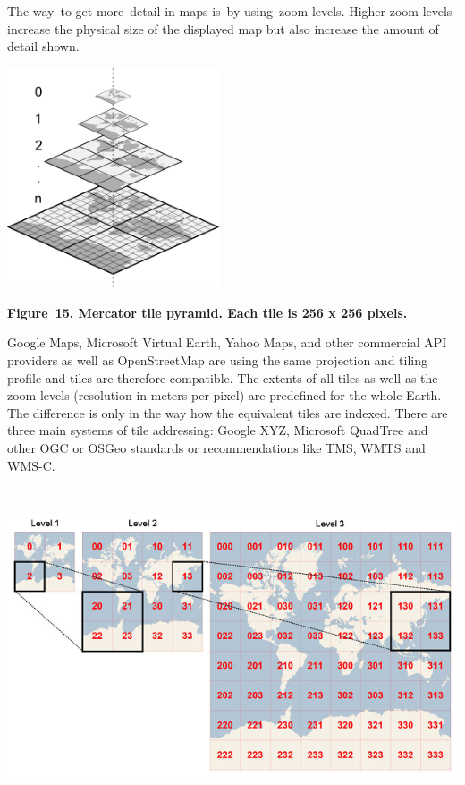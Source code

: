 \documentclass[a4paper]{article}
\begin{document}
The way\ to get more\ detail in maps is\ by using\ zoom levels. Higher
zoom levels increase the physical size of the displayed map but also
increase the amount of detail shown.

{\centering 
\includegraphics[width=2.46933in,height=2.55614in]{out-img19.png} \par}

{\centering\bfseries
Figure\ 15. Mercator tile pyramid. Each tile is 256 x 256 pixels.
\par}

Google Maps, Microsoft Virtual Earth, Yahoo Maps, and other commercial
API providers as well as OpenStreetMap are using the same projection
and tiling profile and tiles are therefore compatible. The extents of
all tiles as well as the zoom levels (resolution in meters per pixel)
are predefined for the whole Earth. The difference is only in the way
how the equivalent tiles are indexed. There are three main systems of
tile addressing: Google XYZ, Microsoft QuadTree and other OGC or OSGeo
standards or recommendations like TMS, WMTS and WMS-C.

 \includegraphics[width=6.29861in,height=3.68976in]{out-img20.jpg} 
\end{document}
